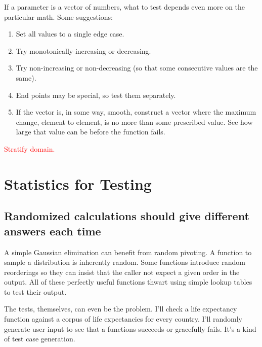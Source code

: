 \documentclass[fleqn,10pt]{olplainarticle}
\newcommand{\aside}[1]{\textcolor{red}{#1}}
\begin{document}
If a parameter is a vector of numbers, what to test depends
even more on the particular math. Some suggestions:
\begin{enumerate}
    \item Set all values to a single edge case.
    \item Try monotonically-increasing or decreasing.
    \item Try non-increasing or non-decreasing (so that some
    consecutive values are the same).
    \item End points may be special, so test them separately.
    \item If the vector is, in some way, smooth, construct
    a vector where the maximum change, element to element, is no
    more than some prescribed value. See how large that value can
    be before the function fails.
\end{enumerate}
\aside{Stratify domain.}



\section{Statistics for Testing}\label{sec:statistical}

\subsection{Randomized calculations should give different answers each time}

%

A simple Gaussian elimination can benefit from random pivoting.
A function to sample a distribution is inherently random.
Some functions introduce random reorderings
so they can insist that the caller not expect a given order
in the output. All of these perfectly useful functions
thwart using simple lookup tables to test their output.

The tests, themselves, can even be the problem. I'll check
a life expectancy function against a corpus of life expectancies
for every country. I'll randomly generate user input
to see that a functions succeeds or gracefully fails.
It's a kind of test case generation.
\end{document}
